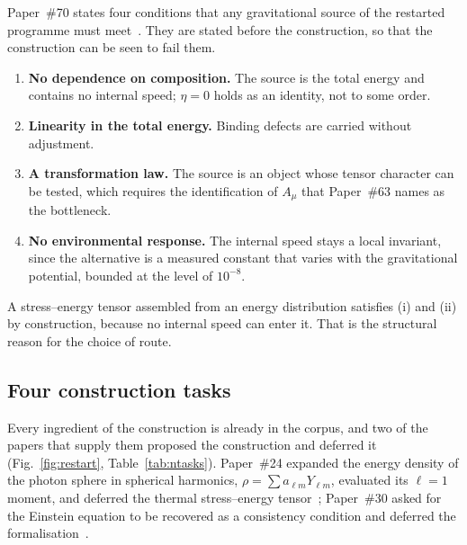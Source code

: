 \documentclass[%
 reprint, amsmath,amssymb, aps, prb, ]{revtex4-2}
\numberwithin{equation}{section}
\begin{document}
Paper~\#70 states four conditions that any gravitational source of the restarted programme must meet~\cite{hanamura70}. They are stated before the construction, so that the construction can be seen to fail them.
\begin{enumerate}[label=(\roman*),leftmargin=*]
\item \textbf{No dependence on composition.} The source is the total energy and contains no internal speed; $\eta = 0$ holds as an identity, not to some order.
\item \textbf{Linearity in the total energy.} Binding defects are carried without adjustment.
\item \textbf{A transformation law.} The source is an object whose tensor character can be tested, which requires the identification of $A_\mu$ that Paper~\#63 names as the bottleneck.
\item \textbf{No environmental response.} The internal speed stays a local invariant, since the alternative is a measured constant that varies with the gravitational potential, bounded at the level of $10^{-8}$.
\end{enumerate}
A stress--energy tensor assembled from an energy distribution satisfies (i) and (ii) by construction, because no internal speed can enter it. That is the structural reason for the choice of route.

\subsection{Four construction tasks}

Every ingredient of the construction is already in the corpus, and two of the papers that supply them proposed the construction and deferred it (Fig.~\ref{fig:restart}, Table~\ref{tab:ntasks}). Paper~\#24 expanded the energy density of the photon sphere in spherical harmonics, $\rho = \sum a_{\ell m}Y_{\ell m}$, evaluated its $\ell = 1$ moment, and deferred the thermal stress--energy tensor~\cite{hanamura24}; Paper~\#30 asked for the Einstein equation to be recovered as a consistency condition and deferred the formalisation~\cite{hanamura30}.
\end{document}
